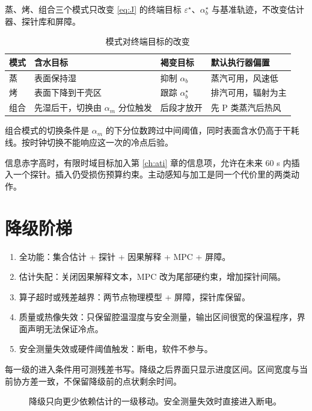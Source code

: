 蒸、烤、组合三个模式只改变 \eqref{eq:J} 的终端目标 $\varepsilon^\star$、$\alpha_b^\star$ 与基准轨迹，不改变估计器、探针库和屏障。

\begin{table}[H]
\centering
\caption{模式对终端目标的改变}
\begin{tabularx}{\textwidth}{lXXX}
\toprule
模式 & 含水目标 & 褐变目标 & 默认执行器偏置 \\
\midrule
蒸 & 表面保持湿 & 抑制 $\alpha_b$ & 蒸汽可用，风速低 \\
烤 & 表面下降到干壳区 & 跟踪 $\alpha_b^\star$ & 排汽可用，辐射为主 \\
组合 & 先湿后干，切换由 $\alpha_m$ 分位触发 & 后段才放开 & 先 P 类蒸汽后热风 \\
\bottomrule
\end{tabularx}
\end{table}

组合模式的切换条件是 $\alpha_m$ 的下分位数跨过中间阈值，同时表面含水仍高于干耗线。按时钟切换不能响应这一次的冷点后验。

信息赤字高时，有限时域目标加入第 \ref{ch:ati} 章的信息项，允许在未来 60 s 内插入一个探针。插入仍受损伤预算约束。主动感知与加工是同一个代价里的两类动作。

\section{降级阶梯}

\begin{enumerate}
\item 全功能：集合估计 + 探针 + 因果解释 + MPC + 屏障。
\item 估计失配：关闭因果解释文本，MPC 改为尾部硬约束，增加探针间隔。
\item 算子超时或残差越界：两节点物理模型 + 屏障，探针库保留。
\item 质量或热像失效：只保留腔温湿度与安全测量，输出区间很宽的保温程序，界面声明无法保证冷点。
\item 安全测量失效或硬件阈值触发：断电，软件不参与。
\end{enumerate}

每一级的进入条件用可测残差书写。降级之后界面只显示进度区间。区间宽度与当前协方差一致，不保留降级前的点状剩余时间。

\begin{figure}[H]
\centering
\small
{}
\caption{降级只向更少依赖估计的一级移动。安全测量失效时直接进入断电。}
\end{figure}

